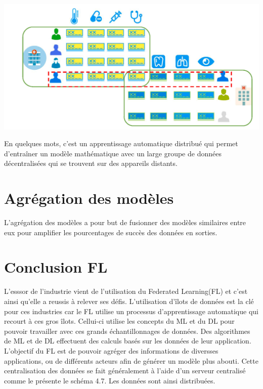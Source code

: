 \documentclass[12pt,a4paper,french]{report}
\begin{document}
\begin{center}
	\includegraphics[scale=0.2]{fl_distribute}
	\label{fig1}
\end{center}

En quelques mots, c'est un apprentissage automatique distribué qui permet d'entraîner un modèle mathématique avec un large groupe de données décentralisées qui se trouvent sur des appareils distants.\\

\section{Agrégation des modèles}

L'agrégation des modèles a pour but de fusionner des modèles similaires entre eux pour amplifier les pourcentages de succès des données en sorties.\\ 



\section{Conclusion FL}

L'esssor de l'industrie vient de l'utilisation du Federated Learning(FL) et c'est ainsi qu'elle a reussis à relever ses défis. L'utilisation d'îlots de données est la clé pour ces industries car le FL utilise un processus d'apprentissage automatique qui recourt à ces gros îlots. Cellui-ci utilise les concepts du ML et du DL pour pouvoir travailler avec ces grands échantillonnages de données. Des algorithmes de ML et de DL effectuent des calculs basés sur les données de leur application. L'objectif du FL est de pouvoir agréger des informations de diversses applications, ou de différents acteurs afin de générer un modèle plus abouti. Cette centralisation des données se fait généralement à l'aide d'un serveur centralisé comme le présente le schéma 4.7. Les données sont ainsi distribuées.
 
\end{document}

